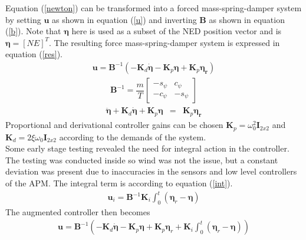 Equation (\ref{newton}) can be transformed into a forced mass-spring-damper system by setting $\boldsymbol{u}$ as shown in equation (\ref{u}) and inverting $\boldsymbol{B}$ as shown in equation (\ref{b}). Note that $\boldsymbol{\eta}$ here is used as a subset of the NED position vector and is $\boldsymbol{\eta} = [N E]^T$. The resulting force mass-spring-damper system is expressed in equation (\ref{res}).
\begin{eqnarray}
\boldsymbol{u} = \boldsymbol{B}^{-1}(-\boldsymbol{K}_d\dot{\boldsymbol{\eta}} - \boldsymbol{K}_p\boldsymbol{\eta} + \boldsymbol{K}_p\boldsymbol{\eta_r})
\label{u}
\end{eqnarray}
\begin{eqnarray}
\boldsymbol{B}^{-1} = \dfrac{m}{T}\begin{bmatrix}
-s_\psi & c_\psi\\
-c_\psi & -s_\psi
\end{bmatrix}
\label{b}
\end{eqnarray}
\begin{eqnarray}
\ddot{\boldsymbol{\eta}} + \boldsymbol{K}_d\dot{\boldsymbol{\eta}} + \boldsymbol{K}_p\boldsymbol{\eta} &=& \boldsymbol{K}_p \boldsymbol{\eta_r}
\label{res}
\end{eqnarray}
Proportional and derivational controller gains can be chosen $\boldsymbol{K}_p = \omega_0^2\boldsymbol{I}_{2x2}$ and $\boldsymbol{K}_d = 2\xi\omega_0\boldsymbol{I}_{2x2}$ according to the demands of the system.\\
\newline
Some early stage testing revealed the need for integral action in the controller. The testing was conducted inside so wind was not the issue, but a constant deviation was present due to inaccuracies in the sensors and low level controllers of the APM. The integral term is according to equation (\ref{int}).
\begin{eqnarray}
\boldsymbol{u}_i =  \boldsymbol{B}^{-1}\boldsymbol{K}_i\int_0^t(\boldsymbol{\eta}_r - \boldsymbol{\eta})
\label{int}
\end{eqnarray}
The augmented controller then becomes
\begin{eqnarray}
\boldsymbol{u} = \boldsymbol{B}^{-1}(-\boldsymbol{K}_d\dot{\boldsymbol{\eta}} - \boldsymbol{K}_p\boldsymbol{\eta} + \boldsymbol{K}_p\boldsymbol{\eta}_r + \boldsymbol{K}_i\int_0^t(\boldsymbol{\eta}_r - \boldsymbol{\eta}))
\end{eqnarray}
